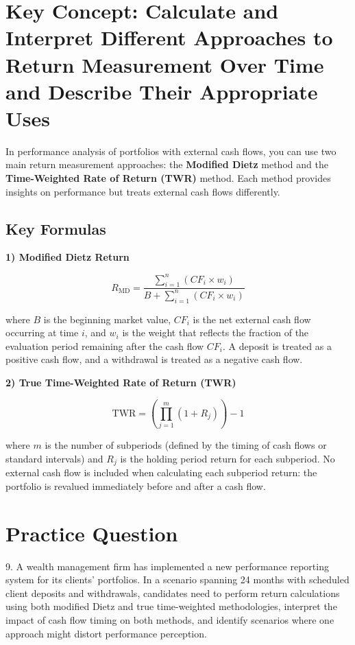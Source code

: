 \section*{Key Concept: Calculate and Interpret Different Approaches to Return Measurement Over Time and Describe Their Appropriate Uses}

In performance analysis of portfolios with external cash flows, you can use two main return measurement approaches: the \textbf{Modified Dietz} method and the \textbf{Time-Weighted Rate of Return (TWR)} method. Each method provides insights on performance but treats external cash flows differently. 

\subsection*{Key Formulas}

\noindent \textbf{1) Modified Dietz Return}

\[
R_{\text{MD}} 
= 
\frac{\sum_{i=1}^{n} \left( CF_{i} \times w_{i} \right)}
{B + \sum_{i=1}^{n} \left( CF_{i} \times w_{i} \right)}
\]

where \(B\) is the beginning market value, \(CF_{i}\) is the net external cash flow occurring at time \(i\), and \(w_{i}\) is the weight that reflects the fraction of the evaluation period remaining after the cash flow \(CF_{i}\). A deposit is treated as a positive cash flow, and a withdrawal is treated as a negative cash flow.

\noindent \textbf{2) True Time-Weighted Rate of Return (TWR)}

\[
\text{TWR} 
= 
\left( \prod_{j=1}^{m} 
\left( 1 + R_{j} \right) \right) 
- 1
\]

where \(m\) is the number of subperiods (defined by the timing of cash flows or standard intervals) and \(R_{j}\) is the holding period return for each subperiod. No external cash flow is included when calculating each subperiod return: the portfolio is revalued immediately before and after a cash flow.

\section*{Practice Question}
9. A wealth management firm has implemented a new performance reporting system for its clients' portfolios. In a scenario spanning 24 months with scheduled client deposits and withdrawals, candidates need to perform return calculations using both modified Dietz and true time-weighted methodologies, interpret the impact of cash flow timing on both methods, and identify scenarios where one approach might distort performance perception.

